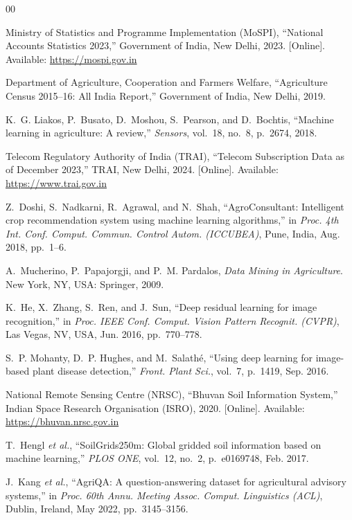 \documentclass[conference]{IEEEtran}
\begin{document}
\begin{thebibliography}{00}

Ministry of Statistics and Programme Implementation (MoSPI),
``National Accounts Statistics 2023,''
Government of India, New Delhi, 2023.
[Online]. Available: \url{https://mospi.gov.in}

Department of Agriculture, Cooperation and Farmers Welfare,
``Agriculture Census 2015--16: All India Report,''
Government of India, New Delhi, 2019.

K.~G. Liakos, P.~Busato, D.~Moshou, S.~Pearson, and D.~Bochtis,
``Machine learning in agriculture: A review,''
\textit{Sensors}, vol.~18, no.~8, p.~2674, 2018.

Telecom Regulatory Authority of India (TRAI),
``Telecom Subscription Data as of December 2023,''
TRAI, New Delhi, 2024.
[Online]. Available: \url{https://www.trai.gov.in}

Z.~Doshi, S.~Nadkarni, R.~Agrawal, and N.~Shah,
``AgroConsultant: Intelligent crop recommendation system using machine
learning algorithms,''
in \textit{Proc. 4th Int. Conf. Comput. Commun. Control Autom. (ICCUBEA)},
Pune, India, Aug. 2018, pp.~1--6.

A.~Mucherino, P.~Papajorgji, and P.~M. Pardalos,
\textit{Data Mining in Agriculture}.
New York, NY, USA: Springer, 2009.

K.~He, X.~Zhang, S.~Ren, and J.~Sun,
``Deep residual learning for image recognition,''
in \textit{Proc. IEEE Conf. Comput. Vision Pattern Recognit. (CVPR)},
Las Vegas, NV, USA, Jun. 2016, pp.~770--778.

S.~P. Mohanty, D.~P. Hughes, and M.~Salath\'{e},
``Using deep learning for image-based plant disease detection,''
\textit{Front. Plant Sci.}, vol.~7, p.~1419, Sep. 2016.

National Remote Sensing Centre (NRSC),
``Bhuvan Soil Information System,''
Indian Space Research Organisation (ISRO), 2020.
[Online]. Available: \url{https://bhuvan.nrsc.gov.in}

T.~Hengl \textit{et al.},
``SoilGrids250m: Global gridded soil information based on machine learning,''
\textit{PLOS ONE}, vol.~12, no.~2, p.~e0169748, Feb. 2017.

J.~Kang \textit{et al.},
``AgriQA: A question-answering dataset for agricultural advisory systems,''
in \textit{Proc. 60th Annu. Meeting Assoc. Comput. Linguistics (ACL)},
Dublin, Ireland, May 2022, pp.~3145--3156.


\end{thebibliography}
\end{document}
